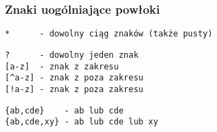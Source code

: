 \documentclass[12pt,aspectratio=169]{beamer}
\begin{document}
\begin{frame}[fragile]

\frametitle{Znaki uogólniające powłoki}

\begin{Verbatim}
*      - dowolny ciąg znaków (także pusty)
\end{Verbatim}
\vspace{4pt}
\begin{Verbatim}
?      - dowolny jeden znak
[a-z]  - znak z zakresu
[^a-z] - znak z poza zakresu
[!a-z] - znak z poza zakresu
\end{Verbatim}
\vspace{4pt}
\begin{Verbatim}
{ab,cde}    - ab lub cde
{ab,cde,xy} - ab lub cde lub xy
\end{Verbatim}

\end{frame}
\end{document}
